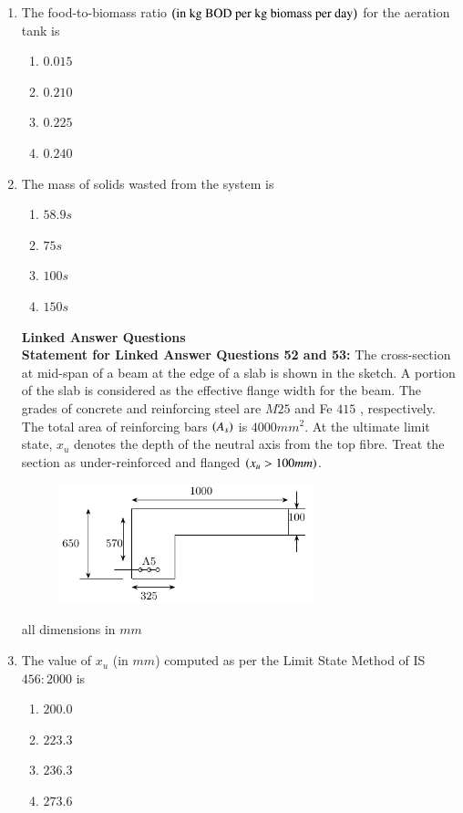 \documentclass[journal]{IEEEtran}
\begin{document}
\begin{enumerate}
	\item  The food-to-biomass  ratio $\left(\text{in kg BOD per kg biomass per day}\right)$ for the aeration tank is
		\begin{enumerate}
			\item $0.015$
			\item $0.210$
			\item $0.225$
			\item $0.240$
        	\end{enumerate}	
	\item The mass  of solids wasted from the system is
		\begin{enumerate}
			\item $58.9 s$
			\item $75 s$
			\item $100 s$
			\item $150 s$
        	\end{enumerate}	
\textbf{Linked Answer Questions}\\
\textbf{Statement for Linked Answer Questions 52 and 53:}
	The cross-section at mid-span of a beam at the edge of a slab is shown in the sketch. A portion of the slab is considered as the effective flange width for the beam. The grades of concrete and reinforcing steel are $M25$ and Fe $415$ , respectively. The total area of reinforcing bars $\left(A_{s}\right)$ is $4000 mm^{2}$. At the ultimate limit state, $x_{u}$ denotes the depth of the neutral axis from the top fibre. Treat the section as under-reinforced and flanged $\left(x_{u}>100 mm\right)$.

 \begin{figure}[h!]
    \centering
    \includegraphics[width=0.7\textwidth]{fig/fig3.pdf}
\end{figure}
 all dimensions in $mm$
       \item The value of $x_{u}$ (in $mm$) computed as per the Limit State Method of IS $456:2000$ is
		\begin{enumerate}
			\item $200.0$
			\item $223.3$
			\item $236.3$
			\item $273.6$
        	\end{enumerate}	
\end{enumerate}	
\end{document}
